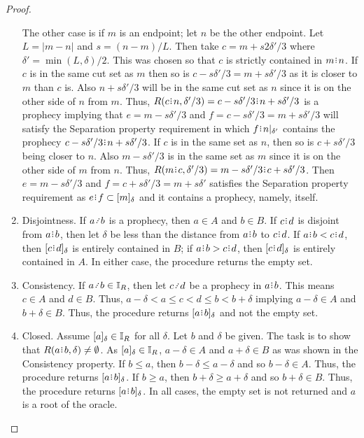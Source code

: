 \documentclass[12pt]{article}
\begin{document}
\begin{proof}
\begin{enumerate}
    The other case is if $m$ is an endpoint; let $n$ be the other endpoint. Let $L = |m-n|$ and $s = (n-m)/L$. Then take $c = m + s2\delta'/3$ where $\delta' = \min(L, \delta)/2$. This was chosen so that $c$ is strictly contained in $m\rint n$. If $c$ is in the same cut set as $m$ then so is $c -s \delta'/3 = m +s \delta'/3$ as it is closer to $m$ than $c$ is. Also $n + s \delta'/3$ will be in the same cut set as $n$ since it is on the other side of $n$ from $m$. Thus, $R(c\rint n, \delta'/3) = c-s\delta'/3 \rint  n+s \delta'/3$ is a prophecy implying that $e=m-s\delta'/3$ and $f=c-s\delta'/3 = m + s \delta'/3$ will satisfy the Separation property requirement in which $f\rint n|_{\delta'}$ contains  the prophecy $c-s\delta'/3 \rint  n+s\delta'/3$. If $c$ is in the same set as $n$, then so is $c + s \delta'/3$ being closer to $n$. Also $m-s \delta'/3$ is in the same set as $m$ since it is on the other side of $m$ from $n$.  Thus, $R(m\rint c, \delta'/3) =  m-s\delta'/3\rint c+s\delta'/3$. Then $e = m-s \delta'/3$ and $f = c + s\delta'/3 = m + s\delta'$ satisfies the Separation property requirement as $e\rint f \subset \halo{m}$ and it contains a prophecy, namely, itself. 

    \item Disjointness. If $a\lte b$ is a prophecy, then $a \in A$ and $b \in B$. If $c\rint d$ is disjoint from $a\rint b$, then let $\delta$ be less than the distance from $a\rint b$ to $c\rint d$. If $a\rint b < c\rint d$, then $\halo{c\rint d}$ is entirely contained in $B$; if $a\rint b > c\rint d$, then $\halo{c\rint d}$ is entirely contained in $A$. In either case, the procedure returns the empty set. 
    
    \item Consistency. If $a \lte b \in \mathbb{I}_R$, then let $c\lte d$ be a prophecy in $a\rint b$. This means $c \in A$ and $d \in B$. Thus, $a-\delta < a \leq c < d \leq b < b + \delta$ implying $a-\delta \in A$ and $b+\delta \in B$. Thus, the procedure returns $\halo{a\rint b}$ and not the empty set. 
    
    \item Closed. Assume $[a]_{\delta} \in \mathbb{I}_R$ for all $\delta$. Let $b$ and $\delta$ be given. The task is to show that $R(a\rint b, \delta) \neq \emptyset$. As $[a]_{\delta} \in \mathbb{I}_R$, $a-\delta \in A$ and $a+\delta \in B$ as was shown in the Consistency property. If $b \leq a$, then $b-\delta \leq a- \delta$ and so $b-\delta \in A$. Thus, the procedure returns $\halo{a\rint b}$. If $b \geq a$, then $b+\delta \geq  a+\delta$ and so $b+\delta \in B$. Thus, the procedure returns $\halo{a\rint b}$. In all cases, the empty set is not returned and $a$ is a root of the oracle. 
\end{enumerate}


\end{proof}
\end{document}
